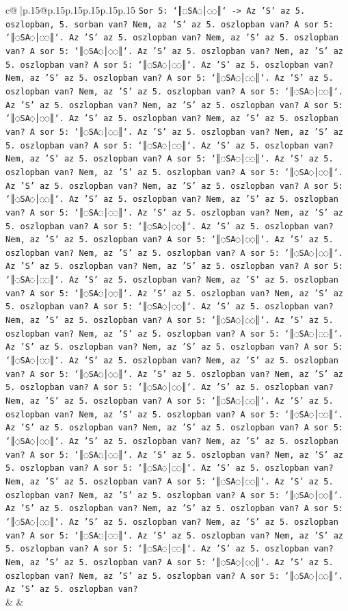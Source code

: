 \documentclass{article}
\begin{document}
{\begin{supertabular}{c@{$\;$}|p{.15\linewidth}@{}p{.15\linewidth}p{.15\linewidth}p{.15\linewidth}p{.15\linewidth}p{.15\linewidth}}
{{{\texttt{Sor 5: `║◌SA◌│◌◌║` {-}> Az 'S' az 5. oszlopban, 5. sorban van? Nem, az 'S' az 5. oszlopban van? A sor 5: `║◌SA◌│◌◌║`. Az 'S' az 5. oszlopban van? Nem, az 'S' az 5. oszlopban van? A sor 5: `║◌SA◌│◌◌║`. Az 'S' az 5. oszlopban van? Nem, az 'S' az 5. oszlopban van? A sor 5: `║◌SA◌│◌◌║`. Az 'S' az 5. oszlopban van? Nem, az 'S' az 5. oszlopban van? A sor 5: `║◌SA◌│◌◌║`. Az 'S' az 5. oszlopban van? Nem, az 'S' az 5. oszlopban van? A sor 5: `║◌SA◌│◌◌║`. Az 'S' az 5. oszlopban van? Nem, az 'S' az 5. oszlopban van? A sor 5: `║◌SA◌│◌◌║`. Az 'S' az 5. oszlopban van? Nem, az 'S' az 5. oszlopban van? A sor 5: `║◌SA◌│◌◌║`. Az 'S' az 5. oszlopban van? Nem, az 'S' az 5. oszlopban van? A sor 5: `║◌SA◌│◌◌║`. Az 'S' az 5. oszlopban van? Nem, az 'S' az 5. oszlopban van? A sor 5: `║◌SA◌│◌◌║`. Az 'S' az 5. oszlopban van? Nem, az 'S' az 5. oszlopban van? A sor 5: `║◌SA◌│◌◌║`. Az 'S' az 5. oszlopban van? Nem, az 'S' az 5. oszlopban van? A sor 5: `║◌SA◌│◌◌║`. Az 'S' az 5. oszlopban van? Nem, az 'S' az 5. oszlopban van? A sor 5: `║◌SA◌│◌◌║`. Az 'S' az 5. oszlopban van? Nem, az 'S' az 5. oszlopban van? A sor 5: `║◌SA◌│◌◌║`. Az 'S' az 5. oszlopban van? Nem, az 'S' az 5. oszlopban van? A sor 5: `║◌SA◌│◌◌║`. Az 'S' az 5. oszlopban van? Nem, az 'S' az 5. oszlopban van? A sor 5: `║◌SA◌│◌◌║`. Az 'S' az 5. oszlopban van? Nem, az 'S' az 5. oszlopban van? A sor 5: `║◌SA◌│◌◌║`. Az 'S' az 5. oszlopban van? Nem, az 'S' az 5. oszlopban van? A sor 5: `║◌SA◌│◌◌║`. Az 'S' az 5. oszlopban van? Nem, az 'S' az 5. oszlopban van? A sor 5: `║◌SA◌│◌◌║`. Az 'S' az 5. oszlopban van? Nem, az 'S' az 5. oszlopban van? A sor 5: `║◌SA◌│◌◌║`. Az 'S' az 5. oszlopban van? Nem, az 'S' az 5. oszlopban van? A sor 5: `║◌SA◌│◌◌║`. Az 'S' az 5. oszlopban van? Nem, az 'S' az 5. oszlopban van? A sor 5: `║◌SA◌│◌◌║`. Az 'S' az 5. oszlopban van? Nem, az 'S' az 5. oszlopban van? A sor 5: `║◌SA◌│◌◌║`. Az 'S' az 5. oszlopban van? Nem, az 'S' az 5. oszlopban van? A sor 5: `║◌SA◌│◌◌║`. Az 'S' az 5. oszlopban van? Nem, az 'S' az 5. oszlopban van? A sor 5: `║◌SA◌│◌◌║`. Az 'S' az 5. oszlopban van? Nem, az 'S' az 5. oszlopban van? A sor 5: `║◌SA◌│◌◌║`. Az 'S' az 5. oszlopban van? Nem, az 'S' az 5. oszlopban van? A sor 5: `║◌SA◌│◌◌║`. Az 'S' az 5. oszlopban van? Nem, az 'S' az 5. oszlopban van? A sor 5: `║◌SA◌│◌◌║`. Az 'S' az 5. oszlopban van? Nem, az 'S' az 5. oszlopban van? A sor 5: `║◌SA◌│◌◌║`. Az 'S' az 5. oszlopban van? Nem, az 'S' az 5. oszlopban van? A sor 5: `║◌SA◌│◌◌║`. Az 'S' az 5. oszlopban van? Nem, az 'S' az 5. oszlopban van? A sor 5: `║◌SA◌│◌◌║`. Az 'S' az 5. oszlopban van? Nem, az 'S' az 5. oszlopban van? A sor 5: `║◌SA◌│◌◌║`. Az 'S' az 5. oszlopban van? Nem, az 'S' az 5. oszlopban van? A sor 5: `║◌SA◌│◌◌║`. Az 'S' az 5. oszlopban van? Nem, az 'S' az 5. oszlopban van? A sor 5: `║◌SA◌│◌◌║`. Az 'S' az 5. oszlopban van? Nem, az 'S' az 5. oszlopban van? A sor 5: `║◌SA◌│◌◌║`. Az 'S' az 5. oszlopban van? Nem, az 'S' az 5. oszlopban van? A sor 5: `║◌SA◌│◌◌║`. Az 'S' az 5. oszlopban van?} \\
            }
        }
    }
    & & \\ \\


\end{supertabular}}
\end{document}
